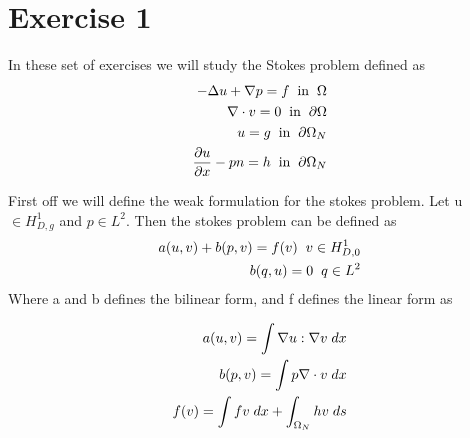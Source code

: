 \documentclass[a4paper,norsk]{article}
\begin{document}
\maketitle

\section{Exercise 1}
In these set of exercises we will study the Stokes problem defined as 
\begin{align*}
-\Delta u + \nabla p = f \hspace{2mm} \text{in} \hspace{2mm} \Omega \\
\nabla \cdot v = 0 \hspace{2mm} \text{in} \hspace{2mm} \partial\Omega \\
u = g \hspace{2mm} \text{in} \hspace{2mm} \partial\Omega_N \\
\frac{\partial u}{\partial x} - pn = h \hspace{2mm} \text{in} \hspace{2mm} \partial\Omega_N\\
\end{align*}

First off we will define the weak formulation for the stokes problem. Let u $\in H_{D,g}^1$ and $p \in L^2$. Then
the stokes problem can be defined as 
\begin{align*}
a(u, v) + b(p, v) = f(v) \hspace{2mm} v \in H_{D,0}^1 \\
b(q, u) = 0 \hspace{2mm} q \in L^2 
\end{align*}
Where a and b defines the bilinear form, and f defines the linear form as

\begin{align*}
a(u, v) = \int \nabla u : \nabla v \hspace{1mm} dx \\
b(p, v) = \int p \nabla \cdot v \hspace{1mm} dx \\
f(v) = \int f v \hspace{1mm} dx + \int_{\Omega_N} h v \hspace{1mm} ds
\end{align*}
\end{document}
